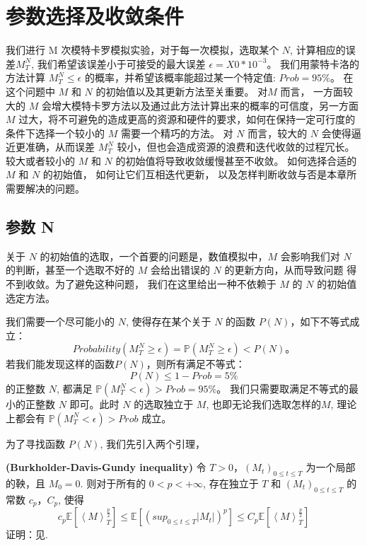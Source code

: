 \chapter{参数选择及收敛条件}
\label{chp:3}
我们进行 M 次模特卡罗模拟实验，对于每一次模拟，选取某个 $N$, 计算相应的误差$M_T^N$, 我们希望该误差小于可接受的最大误差 $\epsilon=X0*10^{-3}$。 
我们用蒙特卡洛的方法计算 $M_T^N\leq \epsilon$ 的概率，并希望该概率能超过某一个特定值: $Prob=95\%$。 
在这个问题中 $M$ 和 $N$ 的初始值以及其更新方法至关重要。 对$M$ 而言， 一方面较大的 $M$ 会增大模特卡罗方法以及通过此方法计算出来的概率的可信度，另一方面
$M$ 过大，将不可避免的造成更高的资源和硬件的要求，如何在保持一定可行度的条件下选择一个较小的 $M$ 需要一个精巧的方法。
对 $N$ 而言，较大的 $N$ 会使得逼近更准确，从而误差 $M_T^N$ 较小，但也会造成资源的浪费和迭代收敛的过程冗长。
较大或者较小的 $M$ 和 $N$ 的初始值将导致收敛缓慢甚至不收敛。
如何选择合适的 $M$ 和 $N$ 的初始值，
如何让它们互相迭代更新， 以及怎样判断收敛与否是本章所需要解决的问题。
\section{参数 N} %
\label{sec:N}
关于 $N$ 的初始值的选取，一个首要的问题是，数值模拟中，$M$ 会影响我们对 $N$ 的判断，甚至一个选取不好的 $M$ 会给出错误的 $N$ 的更新方向，从而导致问题
得不到收敛。为了避免这种问题， 我们在这里给出一种不依赖于 $M$ 的 $N$ 的初始值选定方法。

我们需要一个尽可能小的 $N$, 使得存在某个关于 $N$ 的函数 $P(N)$，如下不等式成立：
\begin{equation}
Probability(M_T^N\geq\epsilon)=\mathbb{P}(M_T^N\geq\epsilon)<P(N)。
\end{equation}
若我们能发现这样的函数$P(N)$，则所有满足不等式：
\begin{equation}
P(N)\leq 1-Prob=5\% 
\end{equation}
的正整数 $N$, 都满足 $\mathbb{P}(M_T^N<\epsilon)>Prob=95\%$。
我们只需要取满足不等式的最小的正整数 $N$ 即可。此时 $N$ 的选取独立于 $M$, 也即无论我们选取怎样的$M$, 理论上都会有 $\mathbb{P}(M_T^N<\epsilon)>Prob$ 成立。

为了寻找函数 $P(N)$, 我们先引入两个引理，

\textbf{(Burkholder-Davis-Gundy inequality)}
令 $T>0$，$(M_t)_{0\leq t\leq T}$ 为一个局部的鞅，且 $M_0=0$. 则对于所有的 $0<p<+\infty$, 存在独立于 $T$ 和 $(M_t)_{0\leq t\leq T}$ 的常数
$c_p$，$C_p$, 使得 
\begin{equation}
c_p\mathbb{E}[\left \langle M \right \rangle_T^{\frac{p}{2}}]\leq \mathbb{E}[(sup_{0\leq t\leq T}|M_t|)^p]\leq C_p\mathbb{E}[\left \langle M \right \rangle_T^{\frac{p}{2}}]
\end{equation}
证明：见\cite{MouvementBrownien}.


